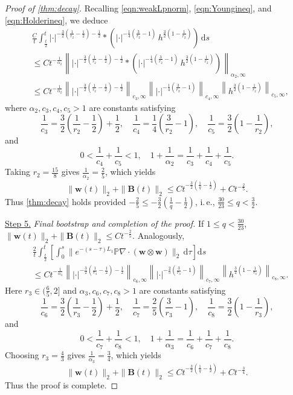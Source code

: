 \documentclass[10pt]{amsart}
\theoremstyle{plain}
\theoremstyle{definition}
\theoremstyle{remark}
\numberwithin{equation}{section}
\newcommand{\bw}{{\boldsymbol{w}}}
\newcommand{\bB}{{\boldsymbol{B}}}
\begin{document}
\begin{proof}[Proof of \cref{thm:decay}]
Recalling
\cref{eqn:weakLpnorm}, \cref{eqn:Youngineq}, and \cref{eqn:Holderineq}, we deduce 
\begin{align*}
&\frac{C}{t} \int_{\frac{t}{2}}^{t} 
|\cdot|^{-\frac{3}{2}(\frac{1}{r_2}-\frac{1}{2})-\frac{1}{2}} \ast ( |\cdot|^{-\frac{1}{4}(\frac{3}{r_2}-1)} \, h^{\frac{3}{2}(1-\frac{1}{r_2})})\, \mathrm{d}s \\
& \le 
C t^{-\frac{1}{\alpha_2}}
\left\| |\cdot|^{-\frac{3}{2}(\frac{1}{r_2}-\frac{1}{2})-\frac{1}{2}} \ast ( |\cdot|^{-\frac{1}{4}(\frac{3}{r_2}-1)} \, h^{\frac{3}{2}(1-\frac{1}{r_2})}) \right\|_{\alpha_2,\infty}\\
& \le  C t^{-\frac{1}{\alpha_2}}
\left\| |\cdot|^{-\frac{3}{2}(\frac{1}{r_2}-\frac{1}{2})-\frac{1}{2}} \right\|_{c_3,\infty}
\left\| |\cdot|^{-\frac{1}{4}(\frac{3}{r_2}-1)} \right\|_{c_4,\infty}
\left\| h^{\frac{3}{2}(1-\frac{1}{r_2})} \right\|_{c_5,\infty},
\end{align*}
where $\alpha_2,c_3,c_4,c_5>1$ are constants satisfying
\[
\frac{1}{c_3}=\frac{3}{2}\left(\frac{1}{r_2}-\frac{1}{2}\right)+\frac{1}{2},\quad
\frac{1}{c_4}= \frac{1}{4}\left(\frac{3}{r_2}-1\right),\quad 
\frac{1}{c_5}=\frac{3}{2}\left(1-\frac{1}{r_2}\right),
\]
and
\[
0< \frac{1}{c_4}+\frac{1}{c_5} <1,\quad 1+\frac{1}{\alpha_2}=\frac{1}{c_3}+\frac{1}{c_4}+\frac{1}{c_5}.
\]
Taking $r_2=\frac{15}{8}$ gives $\frac{1}{\alpha_2}=\frac{2}{5}$, which yields
\[
\|\bw(t)\|_2+\|\bB(t)\|_2 \le Ct^{-\frac{3}{2}(\frac{1}{q}-\frac{1}{2})} + Ct^{-\frac{2}{5}}.
\]
Thus \cref{thm:decay} holds provided $-\frac{2}{5} \le -\frac{3}{2}(\frac{1}{q}-\frac{1}{2})$, i.\,e., $\frac{30}{23} \le q <\frac{3}{2}$.

\uline{Step 
5.} \emph{Final bootstrap and completion of the proof.} If $1 \le q < \frac{30}{23}$, $\|\bw(t)\|_2+\|\bB(t)\|_2 \le Ct^{-\frac{2}{5}}$. Analogously,
\begin{align*}
&\frac{2}{t} \int_{\frac{t}{2}}^{t} \left[ \int_0^s \|e^{-(s-\tau)L_1} \mathbb{P}\nabla\cdot (\bw \otimes \bw)\|_2 \, \mathrm{d} \tau \right] \mathrm{d}s\\
& \le  C t^{-\frac{1}{\alpha_3}}
\left\| |\cdot|^{-\frac{3}{2}(\frac{1}{r_3}-\frac{1}{2})-\frac{1}{2}} \right\|_{c_6,\infty}
\left\| |\cdot|^{-\frac{2}{5}(\frac{3}{r_3}-1)} \right\|_{c_7,\infty}
\left\| h^{\frac{3}{2}(1-\frac{1}{r_3})} \right\|_{c_8,\infty}.
\end{align*}
Here $r_3\in (\frac{6}{5},2]$ and $\alpha_3,c_6,c_7,c_8>1$ are constants satisfying
\[
\frac{1}{c_6}=\frac{3}{2}\left(\frac{1}{r_3}-\frac{1}{2}\right)+\frac{1}{2},\quad
\frac{1}{c_7}= \frac{2}{5}\left(\frac{3}{r_3}-1\right),\quad 
\frac{1}{c_8}=\frac{3}{2}\left(1-\frac{1}{r_3}\right),
\]
and
\[
0< \frac{1}{c_7}+\frac{1}{c_8} <1, \quad 1+\frac{1}{\alpha_3}=\frac{1}{c_6}+\frac{1}{c_7}+\frac{1}{c_8}.
\]
Choosing $r_3=\frac{4}{3}$ gives $\frac{1}{\alpha_3}=\frac{3}{4}$, which yields
\[
\|\bw(t)\|_2+\|\bB(t)\|_2 \le Ct^{-\frac{3}{2}\left(\frac{1}{q}-\frac{1}{2}\right)} + Ct^{-\frac{3}{4}}.
\]
Thus the proof is complete.
\end{proof}
\end{document}
